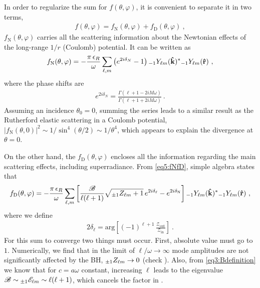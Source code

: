 In order to regularize the sum for $f(\theta,\varphi)$, it is convenient to separate it in two terms,
\begin{align}
    \label{eq5:fNfD}
    f(\theta,\varphi) = f_\mathrm{N}(\theta,\varphi) + f_\mathrm{D}(\theta,\varphi) ~,
\end{align}
$f_\mathrm{N}(\theta,\varphi)$ carries all the scattering information about the Newtonian effects of the long-range $1/r$ (Coulomb) potential.
It can be written as
\begin{align}
    f_\mathrm{N}(\theta,\varphi) = - \frac{\pi \,\epsilon_R}{\omega}
    \sum_{\ell,m} \left( e^{2 i \delta_N } - 1 \right)
    \uu[-1]{Y}{\ell m}(\mathbf{\hat{k}})^{*} \uu[-1]{Y}{\ell m}(\mathbf{\hat{r}}) ~,
\end{align}
where the phase shifts are \cite{Futterman1988}
\begin{align}
    \label{eq5:phaseShiftN}
    e^{2 i \delta_N } = \frac{\Gamma(\ell + 1 - 2 i M \omega)}{\Gamma(\ell+1 + 2 i M \omega)} ~.
\end{align}
Assuming an incidence $\theta_0=0$, summing the series leads to a similar result as the Rutherford elastic scattering in a Coulomb potential, $|f_\mathrm{N}(\theta,0)|^2 \sim 1/\sin^{4}(\theta/2) \sim 1/\theta^4$, which appears to explain the divergence at $\theta=0$. 

On the other hand, the $f_\mathrm{D}(\theta,\varphi)$ encloses all the information regarding the main scattering effects, including superradiance.
From \eqref{eq5:fNfD}, simple algebra states that
\begin{align}
    \label{eq5:fD}
    f_\mathrm{D}(\theta,\varphi) = - \frac{\pi \,\epsilon_R}{\omega}
    \sum_{\ell,m} \left[ \frac{\mathscr{B}}{\ell(\ell+1)} \sqrt{ \uu[\pm 1]{Z}{\ell m} +1 } \,e^{2 i \delta_\ell } - e^{2 i \delta_\mathrm{N} } \right]
    \uu[-1]{Y}{\ell m}(\mathbf{\hat{k}})^{*} \uu[-1]{Y}{\ell m}(\mathbf{\hat{r}}) ~,
\end{align}
where we define
\begin{align}
    \label{eq5:phaseShiftD}
    2 \delta_\ell = \mathrm{arg} \left[ (-1)^{\ell+1} \,\frac{\mathscr{Z}_\mathrm{out}}{\mathscr{Z}_\mathrm{in}} \right] ~.
\end{align}
For this sum to converge two things must occur.
First, absolute value  must go to $1$.
Numerically, we find that in the limit of $\ell/\omega\to \infty$ mode amplitudes are not significantly affected by the BH, $\uu[\pm 1]{Z}{\ell m}\to 0$ (check ).
Also, from \eqref{eq3:Bdefinition} we know that for $c=a\omega$ constant, increasing $\ell$ leads to the eigenvalue $\mathscr{B}\sim \uu[\pm 1]{\mathscr{E}}{\ell m} \sim \ell(\ell+1)$, which cancels the factor in .

